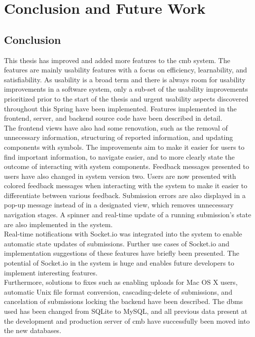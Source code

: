 \chapter{Conclusion and Future Work}
\label{ch:conclusion}

\section{Conclusion}
This thesis has improved and added more features to the \gls{cmb} system. The features are mainly usability features with a focus on efficiency, learnability, and satisfiability. As usability is a broad term and there is always room for usability improvements in a software system, only a sub-set of the usability improvements prioritized prior to the start of the thesis and urgent usability aspects discovered throughout this Spring have been implemented. Features implemented in the frontend, server, and backend source code have been described in detail. \\

The frontend views have also had some renovation, such as the removal of unnecessary information, structuring of reported information, and updating components with symbols. The improvements aim to make it easier for users to find important information, to navigate easier, and to more clearly state the outcome of interacting with system components. Feedback messages presented to users have also changed in system version two. Users are now presented with colored feedback messages when interacting with the system to make it easier to differentiate between various feedback. Submission errors are also displayed in a pop-up message instead of in a designated view, which removes unnecessary navigation stages. A spinner and real-time update of a running submission's state are also implemented in the system. \\

Real-time notifications with Socket.io was integrated into the system to enable automatic state updates of submissions. Further use cases of Socket.io and implementation suggestions of these features have briefly been presented. The potential of Socket.io in the system is huge and enables future developers to implement interesting features. \\

Furthermore, solutions to fixes such as enabling uploads for Mac OS X users, automatic Unix file format conversion, cascading-delete of submissions, and cancelation of submissions locking the backend have been described. The \gls{dbms} used has been changed from SQLite to MySQL, and all previous data present at the development and production server of \gls{cmb} have successfully been moved into the new databases. \\


